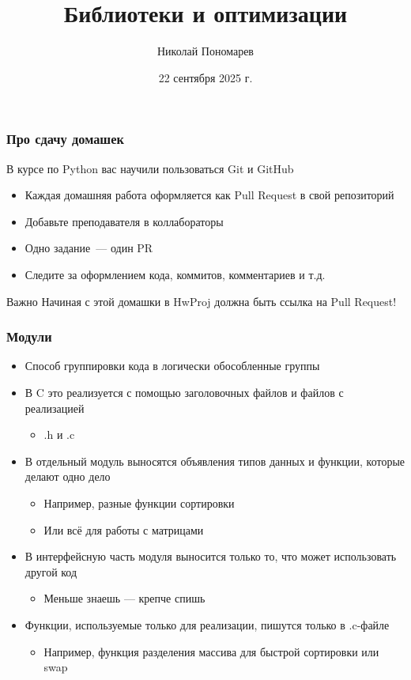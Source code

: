 \documentclass[aspectratio=169]{beamer}
\title{Библиотеки и оптимизации}
\author{Николай Пономарев}
\date{22 сентября 2025 г.}
\begin{document}
\begin{frame}
    \titlepage
\end{frame}

\begin{frame}
    \frametitle{Про сдачу домашек}

    В курсе по Python вас научили пользоваться Git и GitHub

    \begin{itemize}
        \item Каждая домашняя работа оформляется как Pull Request в свой репозиторий
        \item Добавьте преподавателя в коллабораторы
        \item Одно задание~--- один PR
        \item Следите за оформлением кода, коммитов, комментариев и т.д.
    \end{itemize}

    \begin{alertblock}{Важно}
        Начиная с этой домашки в HwProj должна быть ссылка на Pull Request!
    \end{alertblock}
\end{frame}

\begin{frame}
    \frametitle{Модули}
    \begin{itemize}
        \item Способ группировки кода в логически обособленные группы
        \item В C это реализуется с помощью заголовочных файлов и файлов с реализацией
              \begin{itemize}
                  \item .h и .c
              \end{itemize}
        \item В отдельный модуль выносятся объявления типов данных и функции, которые делают одно дело
              \begin{itemize}
                  \item Например, разные функции сортировки
                  \item Или всё для работы с матрицами
              \end{itemize}
        \item В интерфейсную часть модуля выносится только то, что может использовать другой код
              \begin{itemize}
                  \item Меньше знаешь --- крепче спишь
              \end{itemize}
        \item Функции, используемые только для реализации, пишутся только в .c-файле
              \begin{itemize}
                  \item Например, функция разделения массива для быстрой сортировки или swap
              \end{itemize}
    \end{itemize}
\end{frame}
\end{document}
